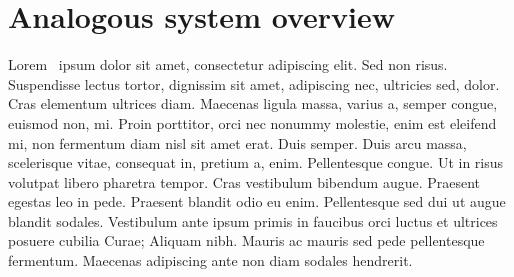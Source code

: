 \documentclass{thesis}
\begin{document}
\section{Analogous system overview}
Lorem~\cite{ciaglia_roboflow_2022} ipsum  dolor sit amet, consectetur adipiscing elit. Sed non risus.
Suspendisse lectus tortor, dignissim sit amet, adipiscing nec, ultricies sed,
dolor. Cras elementum ultrices diam. Maecenas ligula massa, varius a, semper
congue, euismod non, mi. Proin porttitor, orci nec nonummy molestie, enim est
eleifend mi, non fermentum diam nisl sit amet erat. Duis semper. Duis arcu
massa, scelerisque vitae, consequat in, pretium a, enim. Pellentesque congue. Ut \parencite{ciaglia_roboflow_2022}
in risus volutpat libero pharetra tempor. Cras vestibulum bibendum augue.
Praesent egestas leo in pede. Praesent blandit odio eu enim. Pellentesque sed
dui ut augue blandit sodales. Vestibulum ante ipsum primis in faucibus orci
luctus et ultrices posuere cubilia Curae; Aliquam nibh. Mauris ac mauris sed
pede pellentesque fermentum. Maecenas adipiscing ante non diam sodales
hendrerit.

\printbibliography{}
\end{document}
